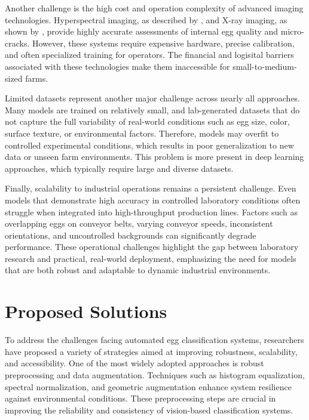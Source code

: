 \documentclass[conference]{IEEEtran}
\begin{document}
	Another challenge is the high cost and operation complexity of advanced imaging technologies. Hyperspectral imaging, as described by \cite{li2021hsi}, and X-ray imaging, as shown by \cite{kumar2023xray}, provide highly accurate assessments of internal egg quality and micro-cracks. However, these systems require expensive hardware, precise calibration, and often specialized training for operators. The financial and logisital barriers associated with these technologies make them inaccessible for small-to-medium-sized farms.
	
	Limited datasets represent another major challenge across nearly all approaches. Many models are trained on relatively small, and lab-generated datasets that do not capture the full variability of real-world conditions such as egg size, color, surface texture, or environmental factors. Therefore, models may overfit to controlled experimental conditions, which results in poor generalization to new data or unseen farm environments. This problem is more present in deep learning approaches, which typically require large and diverse datasets.
	
	Finally, scalability to industrial operations remains a persistent challenge. Even models that demonstrate high accuracy in controlled laboratory conditions often struggle when integrated into high-throughput production lines. Factors such as overlapping eggs on conveyor belts, varying conveyor speeds, inconsistent orientations, and uncontrolled backgrounds can significantly degrade performance. These operational challenges highlight the gap between laboratory research and practical, real-world deployment, emphasizing the need for models that are both robust and adaptable to dynamic industrial environments. \\
	

	
	\section{Proposed Solutions}
	
	To address the challenges facing automated egg classification systems, researchers have proposed a variety of strategies aimed at improving robustness, scalability, and accessibility. One of the most widely adopted approaches is robust preprocessing and data augmentation. Techniques such as histogram equalization, spectral normalization, and geometric augmentation enhance system resilience against environmental conditions. These preprocessing steps are crucial in improving the reliability and consistency of vision-based classification systems.
	
\end{document}
